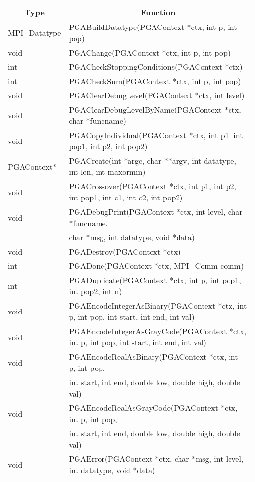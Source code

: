 \documentclass{report}
\begin{document}
\begin{tabular}{|l|l|} \hline\hline
\multicolumn{1}{|c|}{Type} &
\multicolumn{1}{c|}{Function}  \\  \hline\hline
MPI\_Datatype & PGABuildDatatype(PGAContext *ctx, int p, int pop) \\ \hline
void &  PGAChange(PGAContext *ctx, int p, int pop) \\ \hline
int &  PGACheckStoppingConditions(PGAContext *ctx) \\ \hline
int &  PGACheckSum(PGAContext *ctx, int p, int pop) \\ \hline
void &  PGAClearDebugLevel(PGAContext *ctx, int level) \\ \hline
void &  PGAClearDebugLevelByName(PGAContext *ctx, char *funcname) \\ \hline
void &  PGACopyIndividual(PGAContext *ctx, int p1, int pop1, int p2, int pop2)
\\ \hline
PGAContext* &  PGACreate(int *argc, char **argv, int datatype, int len, int maxormin) \\ \hline
void &  PGACrossover(PGAContext *ctx, int p1, int p2, int pop1, int c1, int
c2, int pop2) \\ \hline
void &  PGADebugPrint(PGAContext *ctx, int level, char *funcname, \\
     &  char *msg, int datatype, void *data) \\ \hline
void &  PGADestroy(PGAContext *ctx) \\ \hline
int &  PGADone(PGAContext *ctx, MPI\_Comm comm) \\ \hline
int &  PGADuplicate(PGAContext *ctx, int p, int pop1, int pop2, int n) \\ \hline
void &  PGAEncodeIntegerAsBinary(PGAContext *ctx, int p, int pop, int start,
int end, int val) \\ \hline
void &  PGAEncodeIntegerAsGrayCode(PGAContext *ctx, int p, int pop, int start,
int end, int val) \\ \hline
void &  PGAEncodeRealAsBinary(PGAContext *ctx, int p, int pop, \\
     &  int start, int end, double low, double high, double val) \\ \hline
void &  PGAEncodeRealAsGrayCode(PGAContext *ctx, int p, int pop, \\
     &  int start, int end, double low, double high, double val) \\ \hline
void &  PGAError(PGAContext *ctx, char *msg, int level, int datatype, void
*data) \\ \hline

\end{tabular}
\end{document}
